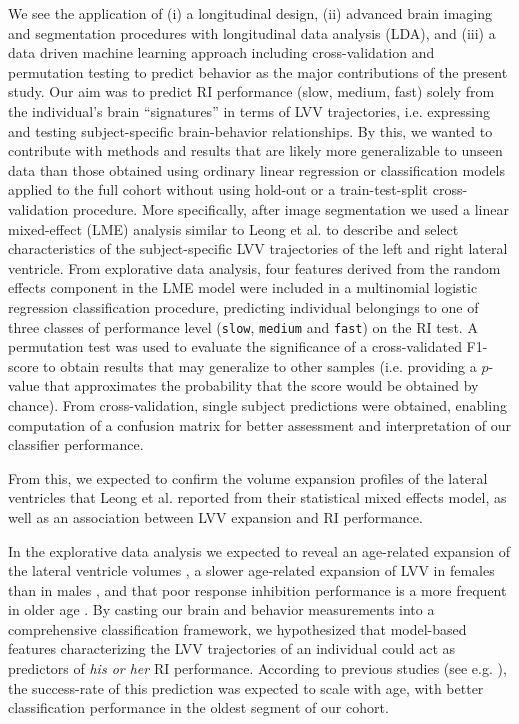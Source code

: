 \documentclass[10pt,letterpaper]{article}
\begin{document}
We see the application of (i) a longitudinal design, (ii) advanced brain imaging and segmentation procedures with longitudinal data analysis (LDA), and (iii) a data driven machine learning approach including cross-validation and permutation testing to predict behavior as the major contributions of the present study. Our aim was to predict RI performance (slow, medium, fast) solely from the individual's brain ``signatures” in terms of LVV trajectories, i.e. expressing and testing subject-specific brain-behavior relationships. 
By this, we wanted to contribute with methods and results that are likely more generalizable to unseen data than those obtained using ordinary linear regression or classification models applied to the full cohort without using hold-out or a train-test-split cross-validation procedure.
More specifically, after image segmentation we used a linear mixed-effect (LME) analysis similar to Leong et al. \cite{Leong2017} to describe and select characteristics of the subject-specific LVV trajectories of the left and right lateral ventricle.
From explorative data analysis, four features derived from the random effects component in the LME model were included in a multinomial logistic regression classification procedure, predicting individual belongings to one of three classes of performance level ({\tt slow}, {\tt medium} and {\tt fast}) on the RI test. A permutation test was used to evaluate the significance of a cross-validated F1-score to obtain results that may generalize to other samples (i.e. providing a $p$-value that approximates the probability that the score would be obtained by chance). From cross-validation, single subject predictions were obtained, enabling computation of a confusion matrix for better assessment and interpretation of our classifier performance.  

From this, we expected to confirm the volume expansion profiles of the lateral ventricles that Leong et al. \cite{Leong2017} reported from their statistical mixed effects model, as well as an association between LVV expansion and RI performance.


In the explorative data analysis we expected to reveal an age-related expansion of the lateral ventricle volumes \cite{Leong2017}, a slower age-related expansion of LVV in females than in males \cite{Chung2006,Hasan2014}, 
and that poor response inhibition performance is a more frequent in older age \cite{Stuss2000, Adolfsdottir2017}. By casting our brain and behavior measurements into a comprehensive classification framework, we hypothesized that model-based features characterizing the LVV  trajectories of an individual could act as predictors of \emph{his or her} RI performance. 
According to previous studies (see e.g. \cite{Nyberg2012}), the success-rate of this prediction was expected to scale with age, with better classification performance in the oldest segment of our cohort. \\ 
\end{document}
